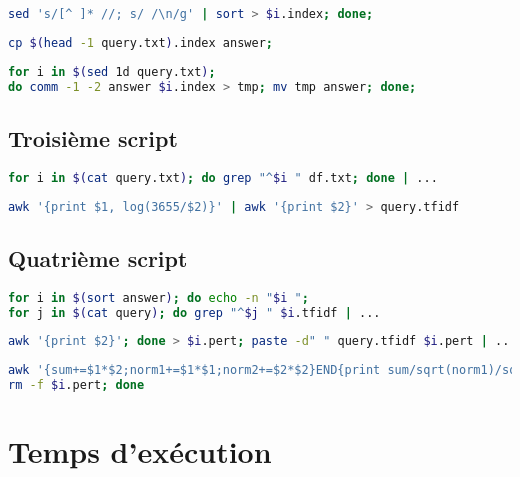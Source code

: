 \documentclass{article}
\begin{document}
\begin{lstlisting}[language=bash,caption={Requête 2}]
sed 's/[^ ]* //; s/ /\n/g' | sort > $i.index; done;
\end{lstlisting}

\begin{lstlisting}[language=bash,caption={Requête 3}]
cp $(head -1 query.txt).index answer;
\end{lstlisting}

\begin{lstlisting}[language=bash,caption={Requête 4}]
for i in $(sed 1d query.txt); 
do comm -1 -2 answer $i.index > tmp; mv tmp answer; done;
\end{lstlisting}

\subsection{Troisième script}

\begin{lstlisting}[language=bash,caption={Requête 1}]
for i in $(cat query.txt); do grep "^$i " df.txt; done | ...
\end{lstlisting}

\begin{lstlisting}[language=bash,caption={Requête 2}]
awk '{print $1, log(3655/$2)}' | awk '{print $2}' > query.tfidf
\end{lstlisting}

\subsection{Quatrième script}

\begin{lstlisting}[language=bash,caption={Requête 1}]
for i in $(sort answer); do echo -n "$i ";
for j in $(cat query); do grep "^$j " $i.tfidf | ...
\end{lstlisting}

\begin{lstlisting}[language=bash,caption={Requête 2}]
awk '{print $2}'; done > $i.pert; paste -d" " query.tfidf $i.pert | ...
\end{lstlisting}

\begin{lstlisting}[language=bash,caption={Requête 3}]
awk '{sum+=$1*$2;norm1+=$1*$1;norm2+=$2*$2}END{print sum/sqrt(norm1)/sqrt(norm2)}';
rm -f $i.pert; done
\end{lstlisting}

\section{Temps d'exécution}
\end{document}
